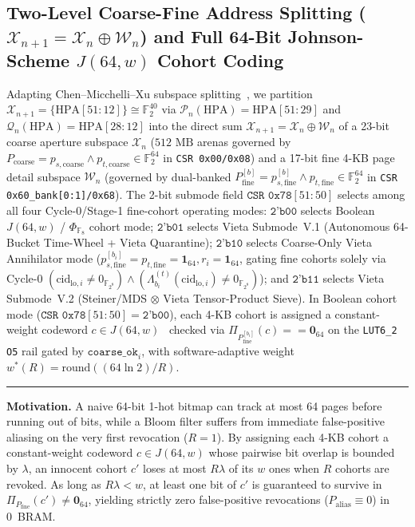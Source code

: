 \documentclass[10pt,twocolumn]{article}
\makeatletter
\newif\ifspecintwocol \specintwocolfalse
\newif\ifspecresume   \specresumefalse
\newcommand{\StopTwoCol}{%
  \if@twocolumn
    \onecolumn
    \global\specintwocolfalse
    \let\spec@next\@empty
  \else
    \ifspecintwocol
      \global\specintwocolfalse
      \def\spec@next{\end{multicols}}%
    \else
      \let\spec@next\@empty
    \fi
  \fi
  \spec@next
}
\newcommand{\BeginConnesPlate}{%
  \if@twocolumn
    \onecolumn
    \global\specresumetrue
    \let\spec@platepre\@empty
  \else
    \ifspecintwocol
      \global\specresumetrue
      \let\spec@platepre\StopTwoCol
    \else
      \global\specresumefalse
      \let\spec@platepre\@empty
    \fi
  \fi
  \spec@platepre
  \par\vspace{4pt}\noindent\textcolor{black!25}{\rule{\textwidth}{0.4pt}}\par\vspace{3pt}%
}
\theoremstyle{spectralthm}
\makeatother
\begin{document}
\subsection{Two-Level Coarse-Fine Address Splitting (\texorpdfstring{$\mathcal{X}_{n+1} = \mathcal{X}_n \oplus \mathcal{W}_n$}{X\_(n+1) = X\_n + W\_n}) and Full 64-Bit Johnson-Scheme \texorpdfstring{$J(64,w)$}{J(64,w)} Cohort Coding}
Adapting Chen--Micchelli--Xu subspace splitting~\cite{chen2001multilevel}, we partition $\mathcal{X}_{n+1} = \{\mathrm{HPA}[51:12]\} \cong \mathbb{F}_2^{40}$ via $\mathcal{P}_n(\mathrm{HPA}) = \mathrm{HPA}[51:29]$ and $\mathcal{Q}_n(\mathrm{HPA}) = \mathrm{HPA}[28:12]$ into the direct sum $\mathcal{X}_{n+1} = \mathcal{X}_n \oplus \mathcal{W}_n$ of a 23-bit coarse aperture subspace $\mathcal{X}_n$ ($512\text{~MB}$ arenas governed by $P_{\mathrm{coarse}} = p_{s,\mathrm{coarse}} \wedge p_{t,\mathrm{coarse}} \in \mathbb{F}_2^{64}$ in \texttt{CSR 0x00/0x08}) and a 17-bit fine 4-KB page detail subspace $\mathcal{W}_n$ (governed by dual-banked $P_{\mathrm{fine}}^{[b]} = p_{s,\mathrm{fine}}^{[b]} \wedge p_{t,\mathrm{fine}} \in \mathbb{F}_2^{64}$ in \texttt{CSR 0x60\_bank[0:1]/0x68}). The 2-bit submode field $\texttt{CSR~0x78}[51:50]$ selects among all four Cycle-0/Stage-1 fine-cohort operating modes: $\texttt{2'b00}$ selects Boolean $J(64,w)$ / $\Phi_{\mathbb{F}_8}$ cohort mode; $\texttt{2'b01}$ selects Vieta Submode~V.1 (Autonomous 64-Bucket Time-Wheel + Vieta Quarantine); $\texttt{2'b10}$ selects Coarse-Only Vieta Annihilator mode ($p_{s,\mathrm{fine}}^{[b_i]} = p_{t,\mathrm{fine}} = \mathbf{1}_{64}, r_i = \mathbf{1}_{64}$, gating fine cohorts solely via Cycle-0 $(\mathrm{cid}_{\mathrm{lo},i} \neq 0_{\mathbb{F}_{2^8}}) \wedge (\Lambda_{b_i}^{(t)}(\mathrm{cid}_{\mathrm{lo},i}) \neq 0_{\mathbb{F}_{2^8}})$); and $\texttt{2'b11}$ selects Vieta Submode~V.2 (Steiner/MDS $\otimes$ Vieta Tensor-Product Sieve). In Boolean cohort mode ($\texttt{CSR~0x78}[51:50] = \texttt{2'b00}$), each 4-KB cohort is assigned a constant-weight codeword $c \in J(64,w)$~\cite{macwilliams1977theory} checked via $\Pi_{P_{\mathrm{fine}}^{[b_i]}}(c) == \mathbf{0}_{64}$ on the \texttt{LUT6\_2 O5} rail gated by $\texttt{coarse\_ok}_i$, with software-adaptive weight $w^*(R) = \mathrm{round}((64 \ln 2)/R)$.

\BeginConnesPlate
\noindent\textbf{Motivation.}\; A naive 64-bit 1-hot bitmap can track at most 64 pages before running out of bits, while a Bloom filter suffers from immediate false-positive aliasing on the very first revocation ($R=1$). By assigning each 4-KB cohort a constant-weight codeword $c \in J(64,w)$ whose pairwise bit overlap is bounded by $\lambda$, an innocent cohort $c'$ loses at most $R\lambda$ of its $w$ ones when $R$ cohorts are revoked. As long as $R\lambda < w$, at least one bit of $c'$ is guaranteed to survive in $\Pi_{P_{\mathrm{fine}}}(c') \neq \mathbf{0}_{64}$, yielding strictly zero false-positive revocations ($P_{\mathrm{alias}} \equiv 0$) in 0~BRAM.
\end{document}
